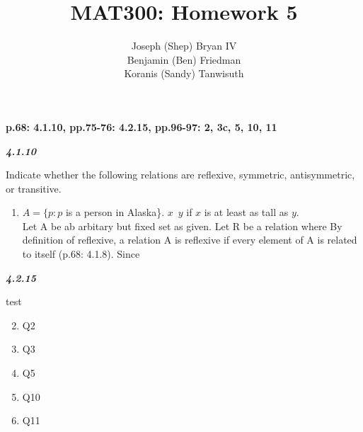 \documentclass{article}
\begin{document}
\title{MAT300: Homework 5}
\author{
	Joseph (Shep) Bryan IV \\
	Benjamin (Ben) Friedman\\
	Koranis (Sandy) Tanwisuth
}

\maketitle
	\begin{flushleft}
		\textbf{p.68: 4.1.10, pp.75-76: 4.2.15, pp.96-97: 2, 3c, 5, 10, 11}

		\textbf{\textit{4.1.10}}
		\begin{flushleft}
			Indicate whether the following relations are reflexive, symmetric, antisymmetric, or transitive.
			\begin{enumerate}
				\item $A = \{p: p$ is a person in Alaska\}. $x$~$y$ if $x$ is at least as tall as $y$.
				\\
				Let A be ab arbitary but fixed set as given. Let R be a relation where By definition of reflexive, a relation A is reflexive if every element of A is related to itself (p.68: 4.1.8).  Since 
				
			\end{enumerate}
		\end{flushleft}
		
		\textbf{\textit{4.2.15}}
		\begin{flushleft}
			test
		\end{flushleft}
		\begin{enumerate}
			\setcounter{enumi}{1}
			\item Q2
		
			\item Q3
		
			\setcounter{enumi}{4}
			\item Q5
		
			\setcounter{enumi}{9}
			\item Q10
		
			\item Q11
	
		\end{enumerate}
	\end{flushleft}
\end{document}
